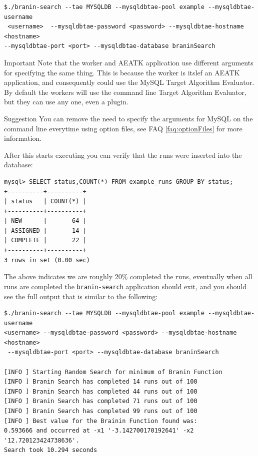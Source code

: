 \documentclass[11pt,letterpaper,oneside]{article}
\begin{document}
\begin{verbatim}
$./branin-search --tae MYSQLDB --mysqldbtae-pool example --mysqldbtae-username
 <username>  --mysqldbtae-password <password> --mysqldbtae-hostname <hostname>
--mysqldbtae-port <port> --mysqldbtae-database braninSearch 
\end{verbatim}

\begin{bclogo}[logo=\bclampe, couleurBarre=red, noborder=true]{Important}
Note that the worker and AEATK application use different arguments for specifying the same thing. This is because the worker is itslef an AEATK application, and consequently could use the MySQL Target Algorithm Evaluator. By default the workers will use the command line Target Algorithm Evaluator, but they can use any one, even a plugin.
\end{bclogo}

\begin{bclogo}[logo=\bclampe, couleurBarre=red, noborder=true]{Suggestion}
You can remove the need to specify the arguments for MySQL on the command line everytime using option files, see FAQ \ref{faq:optionFiles} for more information.
\end{bclogo}

After this starts executing you can verify that the runs were inserted into the database:
\begin{verbatim}
mysql> SELECT status,COUNT(*) FROM example_runs GROUP BY status; 
+----------+----------+
| status   | COUNT(*) |
+----------+----------+
| NEW      |       64 |
| ASSIGNED |       14 |
| COMPLETE |       22 |
+----------+----------+
3 rows in set (0.00 sec)
\end{verbatim}

The above indicates we are roughly 20\% completed the runs, eventually when all runs are completed the \texttt{branin-search} application should exit, and you should see the full output that is similar to the following:

\begin{verbatim}
$./branin-search --tae MYSQLDB --mysqldbtae-pool example --mysqldbtae-username 
<username> --mysqldbtae-password <password> --mysqldbtae-hostname <hostname>
 --mysqldbtae-port <port> --mysqldbtae-database braninSearch
 
[INFO ] Starting Random Search for minimum of Branin Function
[INFO ] Branin Search has completed 14 runs out of 100
[INFO ] Branin Search has completed 44 runs out of 100
[INFO ] Branin Search has completed 71 runs out of 100
[INFO ] Branin Search has completed 99 runs out of 100
[INFO ] Best value for the Brainin Function found was:
0.593666 and occurred at -x1 '-3.142700170192641' -x2 '12.720123424738636'.
Search took 10.294 seconds
\end{verbatim}
\end{document}
